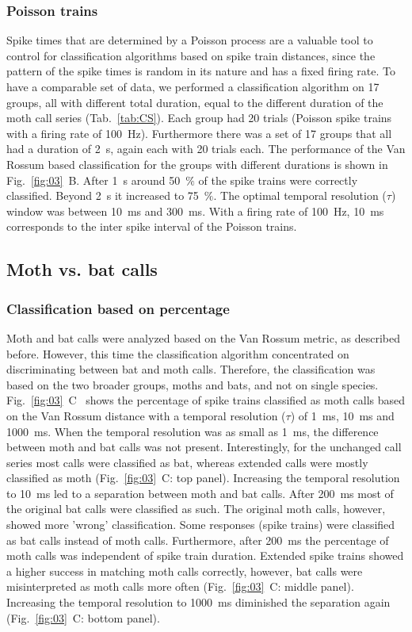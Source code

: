 \documentclass[12pt,a4paper,pdftex]{article}
\newcommand{\fig}[2]{(Fig.~#1~#2)}
\newcommand{\percent}[1]{#1~$\%$}
\begin{document}
\subsubsection*{Poisson trains}
Spike times that are determined by a Poisson process are a valuable tool to control for classification algorithms based on spike train distances, since the pattern of the spike times is random in its nature and has a fixed firing rate.
To have a comparable set of data, we performed a classification algorithm on 17 groups, all with different total duration, equal to the different duration of the moth call series (Tab.~\ref{tab:CS}). Each group had 20 trials (Poisson spike trains with a firing rate of 100~Hz). Furthermore there was a set of 17 groups that all had a duration of 2~s, again each with 20 trials each. The performance of the Van Rossum based classification for the groups with different durations is shown in Fig.~\ref{fig:03}~B. After 1~s around \percent{50} of the spike trains were correctly classified. Beyond 2~s it increased to \percent{75}. The optimal temporal resolution ($ \tau $) window was between 10~ms and 300~ms. With a firing rate of 100~Hz, 10~ms corresponds to the inter spike interval of the Poisson trains.

\subsection*{Moth vs. bat calls}
\subsubsection*{Classification based on percentage}
Moth and bat calls were analyzed based on the Van Rossum metric, as described before. However, this time the classification algorithm concentrated on discriminating between bat and moth calls. Therefore, the classification was based on the two broader groups, moths and bats, and not on single species. 
Fig.~\ref{fig:03}~C~ shows the percentage of spike trains classified as moth calls based on the Van Rossum distance with a temporal resolution ($ \tau $) of 1~ms, 10~ms and 1000~ms. 
When the temporal resolution was as small as 1~ms, the difference between moth and bat calls was not present. Interestingly, for the unchanged call series most calls were classified as bat, whereas extended calls were mostly classified as moth \fig{\ref{fig:03}}{C: top panel}. 
Increasing the temporal resolution to 10~ms led to a separation between moth and bat calls. 
After 200~ms most of the original bat calls were classified as such. The original moth calls, however, showed more 'wrong' classification. Some responses (spike trains) were classified as bat calls instead of moth calls. Furthermore, after 200~ms the percentage of moth calls was independent of spike train duration. Extended spike trains showed a higher success in matching moth calls correctly, however, bat calls were misinterpreted as moth calls more often \fig{\ref{fig:03}}{C: middle panel}. Increasing the temporal resolution to 1000~ms diminished the separation again \fig{\ref{fig:03}}{C: bottom panel}.
\end{document}
